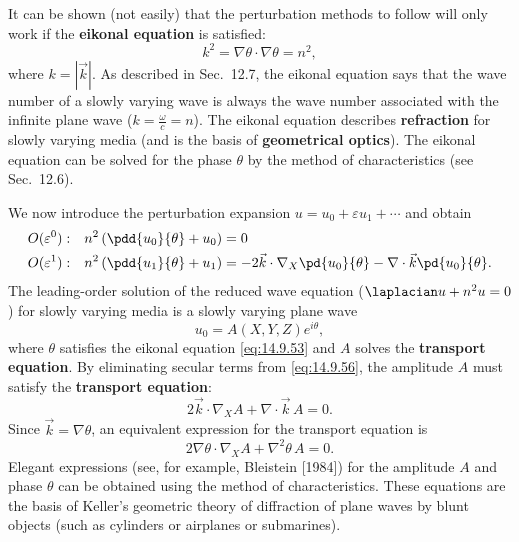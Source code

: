 It can be shown (not easily) that the perturbation methods to follow will only work if the \textbf{eikonal equation} is satisfied:
\begin{equation}
\boxed{k^2 = \nabla\theta\cdot\nabla\theta = n^2,}
\label{eq:14.9.53}
\end{equation}
where $k = |\vec{k}|$. As described in Sec.\ 12.7, the eikonal equation says that the wave number of a slowly varying wave is always the wave number associated with the infinite plane wave ($k = \frac{\omega}{c} = n$). The eikonal equation describes \textbf{refraction} for slowly varying media (and is the basis of \textbf{geometrical optics}). The eikonal equation can be solved for the phase $\theta$ by the method of characteristics (see Sec.\ 12.6).

We now introduce the perturbation expansion $u = u_0 + \varepsilon u_1 + \cdots$ and obtain
\begin{align}
O(\varepsilon^0): \quad &n^2\left(\pdd{u_0}{\theta} + u_0\right) = 0 \label{eq:14.9.55} \\
O(\varepsilon^1): \quad &n^2\left(\pdd{u_1}{\theta} + u_1\right) = -2\vec{k}\cdot\nabla_X\pd{u_0}{\theta} - \nabla\cdot\vec{k}\pd{u_0}{\theta}. \label{eq:14.9.56}
\end{align}
The leading-order solution of the reduced wave equation ($\laplacian u + n^2 u = 0$) for slowly varying media is a slowly varying plane wave
\begin{equation}
\boxed{u_0 = A(X,Y,Z)e^{i\theta},}
\label{eq:14.9.57}
\end{equation}
where $\theta$ satisfies the eikonal equation \eqref{eq:14.9.53} and $A$ solves the \textbf{transport equation}. By eliminating secular terms from \eqref{eq:14.9.56}, the amplitude $A$ must satisfy the \textbf{transport equation}:
\begin{equation}
\boxed{2\vec{k}\cdot\nabla_X A + \nabla\cdot\vec{k}\,A = 0.}
\label{eq:14.9.59}
\end{equation}
Since $\vec{k} = \nabla\theta$, an equivalent expression for the transport equation is
\begin{equation}
\boxed{2\nabla\theta\cdot\nabla_X A + \nabla^2\theta\,A = 0.}
\label{eq:14.9.60}
\end{equation}
Elegant expressions (see, for example, Bleistein [1984]) for the amplitude $A$ and phase $\theta$ can be obtained using the method of characteristics. These equations are the basis of Keller's geometric theory of diffraction of plane waves by blunt objects (such as cylinders or airplanes or submarines).

